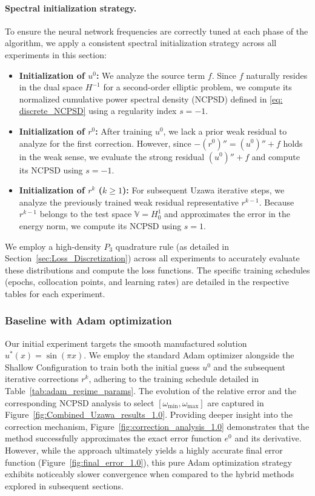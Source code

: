 \documentclass{article}
\theoremstyle{definition}
\begin{document}
\paragraph{Spectral initialization strategy.}
To ensure the neural network frequencies are correctly tuned at each phase of the algorithm, we apply a consistent spectral initialization strategy across all experiments in this section:
\begin{itemize}
    \item \textbf{Initialization of $u^0$:} We analyze the source term $f$. Since $f$ naturally resides in the dual space $H^{-1}$ for a second-order elliptic problem, we compute its normalized cumulative power spectral density (NCPSD) defined in \eqref{eq: discrete_NCPSD} using a regularity index $s = -1$.
    \item \textbf{Initialization of $r^0$:} After training $u^0$, we lack a prior weak residual to analyze for the first correction. However, since $-(r^0)'' = (u^0)'' + f$ holds in the weak sense, we evaluate the strong residual $(u^0)'' + f$ and compute its NCPSD using $s = -1$.
    \item \textbf{Initialization of $r^k$ ($k \ge 1$):} For subsequent Uzawa iterative steps, we analyze the previously trained weak residual representative $r^{k-1}$. Because $r^{k-1}$ belongs to the test space $\mathbb{V} = H^1_0$ and approximates the error in the energy norm, we compute its NCPSD using $s = 1$.
\end{itemize}

We employ a high-density $P_3$ quadrature rule (as detailed in Section~\ref{sec:Loss_Discretization}) across all experiments to accurately evaluate these distributions and compute the loss functions. The specific training schedules (epochs, collocation points, and learning rates) are detailed in the respective tables for each experiment.

\subsubsection{Baseline with Adam optimization}\label{subsec:UzawaRitz1.0}

Our initial experiment targets the smooth manufactured solution $u^{*}(x)=\sin(\pi x)$. We employ the standard Adam optimizer alongside the Shallow Configuration to train both the initial guess $u^0$ and the subsequent iterative corrections $r^k$, adhering to the training schedule detailed in Table~\ref{tab:adam_regime_params}. The evolution of the relative error and the corresponding NCPSD analysis to select $[\omega_{\min},\omega_{\max}]$ are captured in Figure~\ref{fig:Combined_Uzawa_results_1.0}. Providing deeper insight into the correction mechanism, Figure~\ref{fig:correction_analysis_1.0} demonstrates that the method successfully approximates the exact error function $e^0$ and its derivative. However, while the approach ultimately yields a highly accurate final error function (Figure~\ref{fig:final_error_1.0}), this pure Adam optimization strategy exhibits noticeably slower convergence when compared to the hybrid methods explored in subsequent sections.
\end{document}
